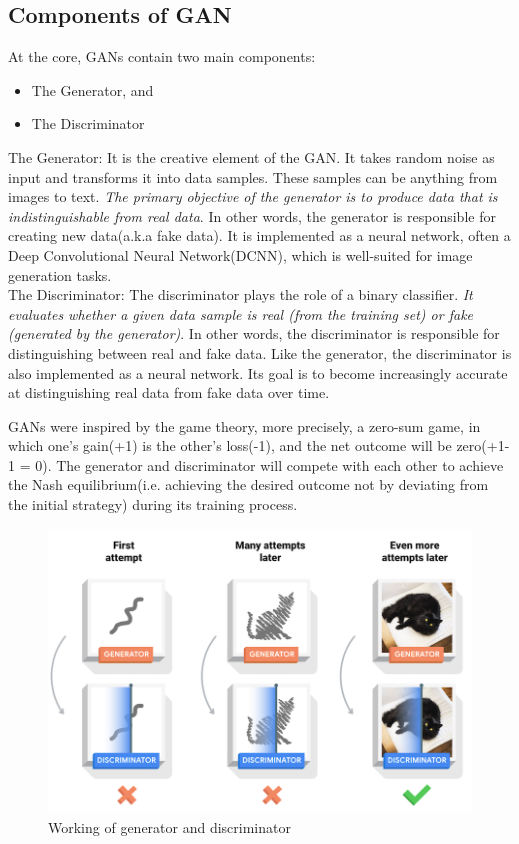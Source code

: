 \subsection{Components of GAN}

\noindent
At the core, GANs contain two main components:
\begin{itemize}
    \item The Generator, and
    \item The Discriminator
\end{itemize}

\noindent
The Generator: It is the creative element of the GAN. It takes random noise as input and transforms it into data samples. These samples can be anything from images to text. \textit{The primary objective of the generator is to produce data that is indistinguishable from real data}. In other words, the generator is responsible for creating new data(a.k.a fake data). It is implemented as a neural network, often a Deep Convolutional Neural Network(DCNN), which is well-suited for image generation tasks\cite{DCNN}.\\

\noindent
The Discriminator: The discriminator plays the role of a binary classifier. \textit{It evaluates whether a given data sample is real (from the training set) or fake (generated by the generator)}. In other words, the discriminator is responsible for distinguishing between real and fake data. Like the generator, the discriminator is also implemented as a neural network. Its goal is to become increasingly accurate at distinguishing real data from fake data over time.

\clearpage

\noindent
GANs were inspired by the game theory, more precisely, a zero-sum game, in which one's gain(+1) is the other's loss(-1), and the net outcome will be zero(+1-1 = 0). The generator and discriminator will compete with each other to achieve the Nash equilibrium(i.e. achieving the desired outcome not by deviating from the initial strategy) during its training process.\cite{GAN_Main}

\begin{figure}[h!]
    \centering
    \includegraphics[width=\textwidth]{Images/gen_dis_working.png}
    \caption{Working of generator and discriminator}
\end{figure}

